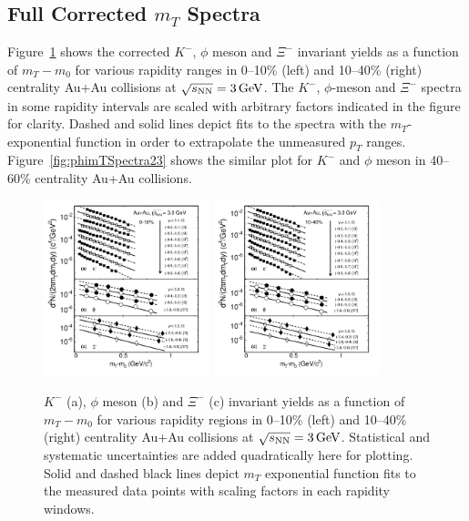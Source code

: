 \documentclass[%
 reprint,	
showpacs,
 amsmath,amssymb,
 aps,
 superscriptaddress,
]{revtex4-1}
\begin{document}
\subsection{Full Corrected $m_T$ Spectra}

Figure~\ref{fig:phimTSpectra21} shows the corrected $K^-$, $\phi$ meson and $\Xi^-$ invariant yields as a function of $m_T-m_0$ for various rapidity ranges in 0--10\% (left) and 10--40\% (right) centrality Au+Au collisions at ${\sqrt{s_{\rm NN}} = \rm{3\,GeV}}$. The $K^-$, $\phi$-meson and $\Xi^-$ spectra in some rapidity intervals are scaled with arbitrary factors indicated in the figure for clarity. Dashed and solid lines depict fits to the spectra with the $m_T$-exponential function in order to extrapolate the unmeasured $p_T$ ranges. Figure~\ref{fig:phimTSpectra23} shows the similar plot for $K^-$ and $\phi$ meson in 40--60\% centrality Au+Au collisions.

\begin{figure}
\centering
\includegraphics[width=0.43\textwidth]{fig21-eps-converted-to.pdf}
\includegraphics[width=0.43\textwidth]{fig22-eps-converted-to.pdf}
\caption{$K^-$ (a), $\phi$ meson (b) and $\Xi^-$ (c) invariant yields as a function of $m_T-m_0$ for various rapidity regions in 0--10\% (left) and  10--40\% (right) centrality Au+Au collisions at ${\sqrt{s_{\rm NN}} = \rm{3\,GeV}}$. Statistical and systematic uncertainties are added quadratically here for plotting. Solid and dashed black lines depict $m_T$ exponential function fits to the measured data points with scaling factors in each rapidity windows.}
\label{fig:phimTSpectra21}
\end{figure}
\end{document}
